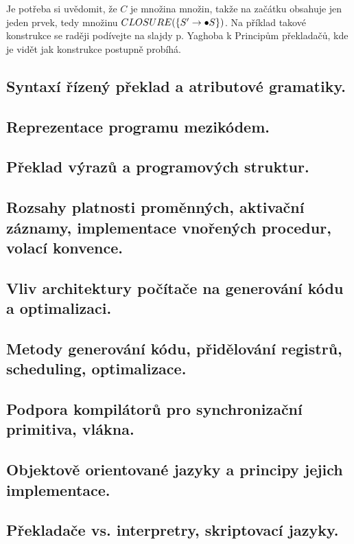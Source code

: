 Je potřeba si uvědomit, že \(C\) je množina množin, takže na začátku obsahuje jen jeden prvek, tedy množinu \(CLOSURE(\{S' \to \bullet S\})\). Na příklad takové konstrukce se raději podívejte na slajdy p. Yaghoba k Principům překladačů, kde je vidět jak konstrukce postupně probíhá.




\subsection{Syntaxí řízený překlad a atributové gramatiky.}
\subsection{Reprezentace programu mezikódem.}
\subsection{Překlad výrazů a programových struktur.}
\subsection{Rozsahy platnosti proměnných, aktivační záznamy, implementace vnořených procedur, volací konvence.}
\subsection{Vliv architektury počítače na generování kódu a optimalizaci.}
\subsection{Metody generování kódu, přidělování registrů, scheduling, optimalizace.}
\subsection{Podpora kompilátorů pro synchronizační primitiva, vlákna.}
\subsection{Objektově orientované jazyky a principy jejich implementace.}
\subsection{Překladače vs. interpretry, skriptovací jazyky.}
